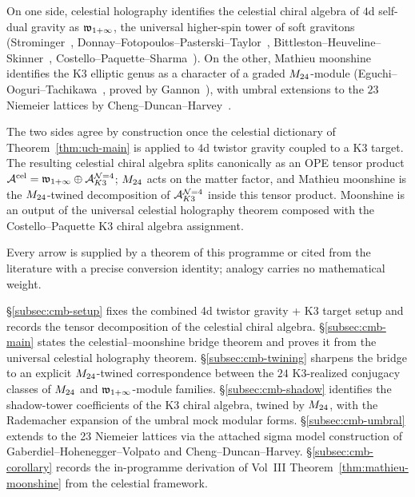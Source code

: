 \noindent
On one side, celestial holography identifies the celestial chiral algebra of $4$d
self-dual gravity as $\mathfrak w_{1+\infty}$, the universal higher-spin tower of soft
gravitons (Strominger~\cite{StromingerWInfinityCelestial},
Donnay--Fotopoulos--Pasterski--Taylor~\cite{DonnayFotopoulosPasterskiTaylor21,
DonnayFotopoulosPasterskiTaylor22},
Bittleston--Heuveline--Skinner~\cite{BittlestonHeuvelineSkinner},
Costello--Paquette--Sharma~\cite{CostelloPaquetteSharmaCelestial}). On the
other, Mathieu moonshine identifies the K3 elliptic genus as a character
of a graded $M_{24}$-module
(Eguchi--Ooguri--Tachikawa~\cite{EguchiOoguriTachikawa10},
proved by Gannon~\cite{Gannon16}), with umbral extensions to the $23$
Niemeier lattices by Cheng--Duncan--Harvey~\cite{ChengDuncanHarvey1,
ChengDuncanHarvey2}.

The two sides agree by construction once
the celestial dictionary of
Theorem~\ref{thm:uch-main} is applied to $4$d twistor gravity coupled
to a K3 target. The resulting celestial chiral algebra splits
canonically as an OPE tensor product
$\mathcal A^{\mathrm{cel}} = \mathfrak w_{1+\infty} \oplus \mathcal A^{\mathcal{N}{=}4}_{K3}$;
$M_{24}$ acts on the matter factor, and Mathieu moonshine is
the $M_{24}$-twined decomposition of
$\mathcal A^{\mathcal{N}{=}4}_{K3}$ inside this tensor product. Moonshine
is an output of the universal celestial
holography theorem composed with the Costello--Paquette K3 chiral
algebra assignment.

Every arrow is supplied by a theorem of this programme or cited from the literature
with a precise conversion identity; analogy carries no mathematical
weight.

\S\ref{subsec:cmb-setup} fixes the combined 4d twistor gravity + K3
target setup and records the tensor decomposition of the celestial
chiral algebra.
\S\ref{subsec:cmb-main} states the celestial--moonshine bridge theorem
and proves it from the universal celestial holography theorem.
\S\ref{subsec:cmb-twining} sharpens the bridge to an explicit
$M_{24}$-twined correspondence between the $24$ K3-realized conjugacy
classes of $M_{24}$ and $\mathfrak w_{1+\infty}$-module families.
\S\ref{subsec:cmb-shadow} identifies the shadow-tower coefficients of
the K3 chiral algebra, twined by $M_{24}$, with the Rademacher
expansion of the umbral mock modular forms.
\S\ref{subsec:cmb-umbral} extends to the 23 Niemeier lattices via the
attached sigma model construction of
Gaberdiel--Hohenegger--Volpato and Cheng--Duncan--Harvey.
\S\ref{subsec:cmb-corollary} records the in-programme derivation of Vol~III
Theorem~\ref{thm:mathieu-moonshine} from the celestial framework.

